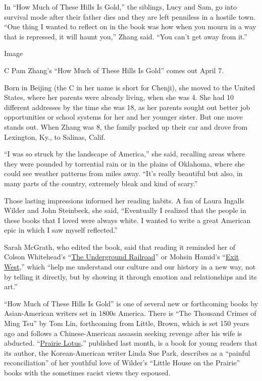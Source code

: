 In ``How Much of These Hills Is Gold,'' the siblings, Lucy and Sam, go
into survival mode after their father dies and they are left penniless
in a hostile town. ``One thing I wanted to reflect on in the book was
how when you mourn in a way that is repressed, it will haunt you,''
Zhang said. ``You can't get away from it.''

Image

C Pam Zhang's ``How Much of These Hills Is Gold'' comes out April 7.

Born in Beijing (the C in her name is short for Chenji), she moved to
the United States, where her parents were already living, when she was
4. She had 10 different addresses by the time she was 18, as her parents
sought out better job opportunities or school systems for her and her
younger sister. But one move stands out. When Zhang was 8, the family
packed up their car and drove from Lexington, Ky., to Salinas, Calif.

``I was so struck by the landscape of America,'' she said, recalling
areas where they were pounded by torrential rain or in the plains of
Oklahoma, where she could see weather patterns from miles away. ``It's
really beautiful but also, in many parts of the country, extremely bleak
and kind of scary.''

Those lasting impressions informed her reading habits. A fan of Laura
Ingalls Wilder and John Steinbeck, she said, ``Eventually I realized
that the people in these books that I loved were always white. I wanted
to write a great American epic in which I saw myself reflected.''

Sarah McGrath, who edited the book, said that reading it reminded her of
Colson Whitehead's
``\href{https://www.nytimes3xbfgragh.onion/2016/08/03/books/review-the-underground-railroad-colson-whitehead.html}{The
Underground Railroad}'' or Mohsin Hamid's
``\href{https://www.nytimes3xbfgragh.onion/2017/03/10/books/review/exit-west-mohsin-hamid.html}{Exit
West},'' which ``help me understand our culture and our history in a new
way, not by telling it directly, but by showing it through emotion and
relationships and its art.''

``How Much of These Hills Is Gold'' is one of several new or forthcoming
books by Asian-American writers set in 1800s America. There is ``The
Thousand Crimes of Ming Tsu'' by Tom Lin, forthcoming from Little,
Brown, which is set 150 years ago and follows a Chinese-American
assassin seeking revenge after his wife is abducted.
``\href{https://www.nytimes3xbfgragh.onion/2020/03/06/books/review/prairie-lotus-linda-sue-park.html}{Prairie
Lotus},'' published last month, is a book for young readers that its
author, the Korean-American writer Linda Sue Park, describes as a
``painful reconciliation'' of her youthful love of Wilder's ``Little
House on the Prairie'' books with the sometimes racist views they
espoused.

